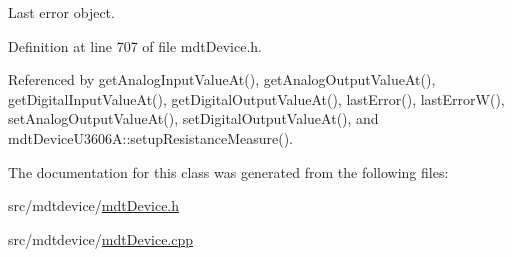 Last error object. 



Definition at line 707 of file mdt\-Device.\-h.



Referenced by get\-Analog\-Input\-Value\-At(), get\-Analog\-Output\-Value\-At(), get\-Digital\-Input\-Value\-At(), get\-Digital\-Output\-Value\-At(), last\-Error(), last\-Error\-W(), set\-Analog\-Output\-Value\-At(), set\-Digital\-Output\-Value\-At(), and mdt\-Device\-U3606\-A\-::setup\-Resistance\-Measure().



The documentation for this class was generated from the following files\-:\begin{DoxyCompactItemize}
\item 
src/mdtdevice/\hyperlink{mdt_device_8h}{mdt\-Device.\-h}\item 
src/mdtdevice/\hyperlink{mdt_device_8cpp}{mdt\-Device.\-cpp}\end{DoxyCompactItemize}
